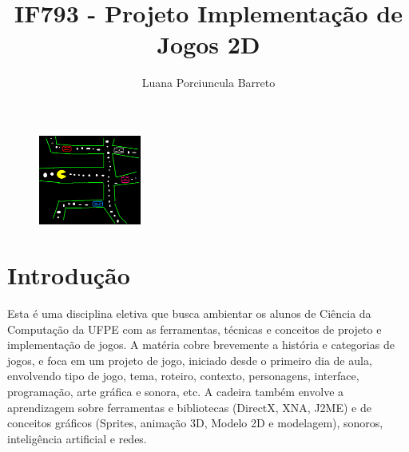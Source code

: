\documentclass[a4paper]{article}
\title{IF793 - Projeto Implementação de Jogos 2D}
\author{Luana Porciuncula Barreto}
\begin{document}
\maketitle

\begin{figure}[h]
	\centering
	\includegraphics[width=0.3\textwidth]{lpb1.PNG}
\end{figure}

% 
% 

\section{Introdução}

Esta é uma disciplina eletiva que busca ambientar os alunos de Ciência da Computação da UFPE com as ferramentas, técnicas e conceitos de projeto e implementação de jogos. A matéria cobre brevemente a história e categorias de jogos, e foca em um projeto de jogo, iniciado desde o primeiro dia de aula, envolvendo tipo de jogo, tema, roteiro, contexto, personagens, interface, programação, arte gráfica e sonora, etc. A cadeira também envolve a aprendizagem  sobre ferramentas e bibliotecas (DirectX, XNA, J2ME) e de conceitos gráficos (Sprites, animação 3D, Modelo 2D e modelagem), sonoros, inteligência artificial e redes.
\end{document}
